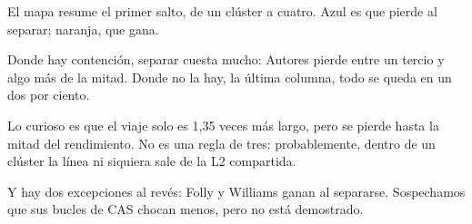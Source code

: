 El mapa resume el primer salto, de un clúster a cuatro. Azul es que pierde al separar; naranja, que gana.

Donde hay contención, separar cuesta mucho: Autores pierde entre un tercio y algo más de la mitad. Donde no la hay, la última columna, todo se queda en un dos por ciento.

Lo curioso es que el viaje solo es 1,35 veces más largo, pero se pierde hasta la mitad del rendimiento. No es una regla de tres: probablemente, dentro de un clúster la línea ni siquiera sale de la L2 compartida.

Y hay dos excepciones al revés: Folly y Williams ganan al separarse. Sospechamos que sus bucles de CAS chocan menos, pero no está demostrado.
